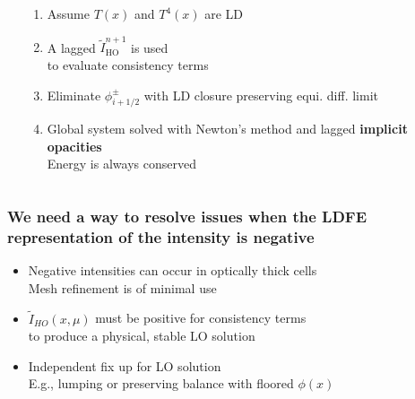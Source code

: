 \documentclass[xcolor=dvipsnames,hyperref={pdfpagelabels=false},unknownkeysallowed]{beamer}
\newcommand{\colb}[1]{{\color{blue} #1}}
\newcommand{\colG}[1]{{\color{Gray!110} #1}}
\newlength{\wideitemsep}
\let\olditem\item
\renewcommand{\item}{\setlength{\itemsep}{\wideitemsep}\olditem}
\newcommand{\mom}[1]{\langle #1 \rangle}
\begin{document}
\begin{frame}
\begin{columns}
\begin{column}{0.2\linewidth}
\begin{centering}
    \end{centering}
\end{column}
\begin{column}{0.75\linewidth}
    \addtolength{\wideitemsep}{0.11in}
    \begin{enumerate}
        \item Assume $T(x)$ and $T^4(x)$ are LD 
        \item A lagged \colb{ $\tilde{I}_{\text{HO}}^{n+1}$} is used \\ to evaluate
        consistency terms 
        \item Eliminate $\phi_{i+1/2}^\pm$ with LD closure
            \colG{preserving equi. diff. limit}
            \begin{center}{\textcolor{Gray}{%
                    \fbox{ {\color{black} $\displaystyle  
      \phi_{i+1/2}^+ = 2\mom{\phi}_{R,i}^+ - \mom{\phi}_{L,i}^+$}}}}
            \end{center}
       \item Global system solved with Newton's method and lagged \textbf{implicit
           opacities}\\ \colG{Energy is always conserved}
       \end{enumerate}
    \end{column}
\end{columns}
\end{frame}

\begin{frame}
    \frametitle{We need a way to resolve issues when the LDFE representation of the intensity is
        negative}
    {\addtolength\wideitemsep{5pt}
    \begin{itemize}
        \item[] Negative intensities can occur in optically thick cells \\
            \colG{Mesh refinement is of minimal use}
        \item[] $\tilde I_{HO}(x,\mu)$ must be positive for consistency terms \\
            \colG{to produce a physical, stable LO solution}
         \item[] Independent fix up for LO solution
             \colG{\\E.g., lumping or preserving balance with floored $\phi(x)$}
    \end{itemize}
}

\end{frame}
\end{document}
